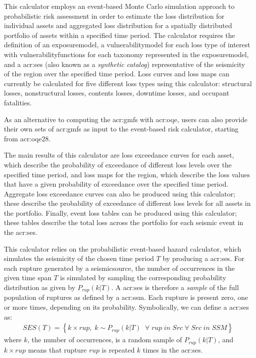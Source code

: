 This calculator employs an event-based Monte Carlo simulation approach to
probabilistic risk assessment in order to estimate the loss distribution for
individual \glspl{asset} and aggregated loss distribution for a spatially
distributed portfolio of \glspl{asset} within a specified time period. The
calculator requires the definition of an \gls{exposuremodel}, a
\gls{vulnerabilitymodel} for each loss type of interest with
\glspl{vulnerabilityfunction} for each taxonomy represented in the
\gls{exposuremodel}, and a \glsdesc{acr:ses} (also known as a
\textit{synthetic catalog}) representative of the seismicity of the region
over the specified time period. Loss curves and loss maps can currently be
calculated for five different loss types using this calculator: structural
losses, nonstructural losses, contents losses, downtime losses, and occupant
fatalities.

As an alternative to computing the \glspl{acr:gmf} with \glsdesc{acr:oqe},
users can also provide their own sets of \glspl{acr:gmf} as input to the
event-based risk calculator, starting from \gls{acr:oqe28}.

The main results of this calculator are loss
exceedance curves for each \gls{asset}, which describe the probability of
exceedance of different loss levels over the specified time period, and loss
maps for the region, which describe the loss values that have a given
probability of exceedance over the specified time period. Aggregate loss
exceedance curves can also be produced using this calculator; these
describe the probability of exceedance of different loss levels for all
\glspl{asset} in the portfolio. Finally, event loss tables can be produced
using this calculator; these tables describe the total loss across the
portfolio for each seismic event in the \gls{acr:ses}.

This calculator relies on the probabilistic event-based hazard calculator,
which simulates the seismicity of the chosen time period $T$ by producing a
\gls{acr:ses}. For each \gls{rupture} generated by a \gls{seismicsource}, the
number of occurrences in the given time span $T$ is simulated by sampling the
corresponding probability distribution as given by $P_{rup}(k | T)$. A
\gls{acr:ses} is therefore a \textit{sample} of the full population of
\glspl{rupture} as defined by a \glsdesc{acr:ssm}. Each \gls{rupture} is
present zero, one or more times, depending on its probability. Symbolically,
we can define a \gls{acr:ses} as:
\begin{align}
SES(T) = \left\{k \times rup,\;k\sim P_{rup}(k | T)\;\;\forall\;rup\;in\;Src\;\forall\;Src\;in\;SSM\right\}
\end{align}
where $k$, the number of occurrences, is a random sample of $P_{rup}(k | T)$,
and $k \times rup$ means that \gls{rupture} $rup$ is repeated $k$ times in the
\gls{acr:ses}.

